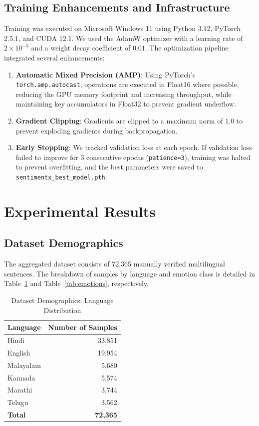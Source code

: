 \documentclass[conference]{IEEEtran}
\begin{document}
\subsection{Training Enhancements and Infrastructure}
Training was executed on Microsoft Windows 11 using Python 3.12, PyTorch 2.5.1, and CUDA 12.1. We used the AdamW optimizer with a learning rate of $2 \times 10^{-5}$ and a weight decay coefficient of $0.01$. The optimization pipeline integrated several enhancements:
\begin{enumerate}
    \item \textbf{Automatic Mixed Precision (AMP)}: Using PyTorch's \texttt{torch.amp.autocast}, operations are executed in Float16 where possible, reducing the GPU memory footprint and increasing throughput, while maintaining key accumulators in Float32 to prevent gradient underflow.
    \item \textbf{Gradient Clipping}: Gradients are clipped to a maximum norm of $1.0$ to prevent exploding gradients during backpropagation.
    \item \textbf{Early Stopping}: We tracked validation loss at each epoch. If validation loss failed to improve for 3 consecutive epochs (\texttt{patience=3}), training was halted to prevent overfitting, and the best parameters were saved to \texttt{sentimentx\_best\_model.pth}.
\end{enumerate}

\section{Experimental Results}
\subsection{Dataset Demographics}
The aggregated dataset consists of 72,365 manually verified multilingual sentences. The breakdown of samples by language and emotion class is detailed in Table~\ref{tab:languages} and Table~\ref{tab:emotions}, respectively.

\begin{table}[h]
\caption{Dataset Demographics: Language Distribution}
\label{tab:languages}
\centering
\begin{tabular}{lr}
\toprule
\textbf{Language} & \textbf{Number of Samples} \\
\midrule
Hindi & 33,851 \\
English & 19,954 \\
Malayalam & 5,680 \\
Kannada & 5,574 \\
Marathi & 3,744 \\
Telugu & 3,562 \\
\midrule
\textbf{Total} & \textbf{72,365} \\
\bottomrule
\end{tabular}
\end{table}
\end{document}
